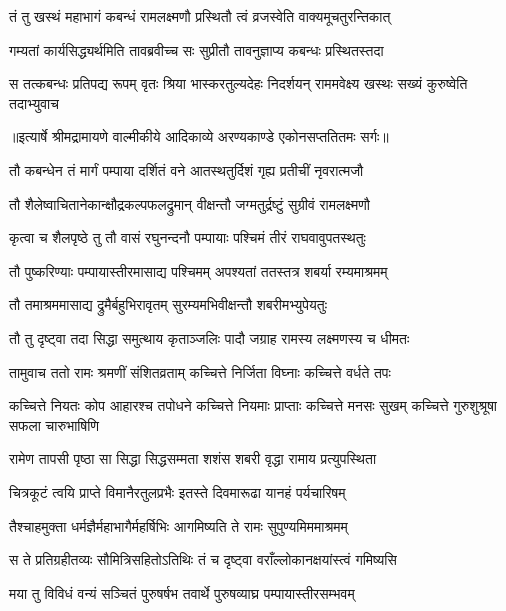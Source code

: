 \twolineshloka
{तं तु खस्थं महाभागं कबन्धं रामलक्ष्मणौ}
{प्रस्थितौ त्वं व्रजस्वेति वाक्यमूचतुरन्तिकात्} %

\twolineshloka
{गम्यतां कार्यसिद्ध्यर्थमिति तावब्रवीच्च सः}
{सुप्रीतौ तावनुज्ञाप्य कबन्धः प्रस्थितस्तदा} %

\fourlineindentedshloka
{स तत्कबन्धः प्रतिपद्य रूपम्}
{वृतः श्रिया भास्करतुल्यदेहः}
{निदर्शयन् राममवेक्ष्य खस्थः}
{सख्यं कुरुष्वेति तदाभ्युवाच} %


{॥इत्यार्षे श्रीमद्रामायणे वाल्मीकीये आदिकाव्ये अरण्यकाण्डे एकोनसप्ततितमः सर्गः॥}


\twolineshloka
{तौ कबन्धेन तं मार्गं पम्पाया दर्शितं वने}
{आतस्थतुर्दिशं गृह्य प्रतीचीं नृवरात्मजौ} %

\twolineshloka
{तौ शैलेष्वाचितानेकान्क्षौद्रकल्पफलद्रुमान्}
{वीक्षन्तौ जग्मतुर्द्रष्टुं सुग्रीवं रामलक्ष्मणौ} %

\twolineshloka
{कृत्वा च शैलपृष्ठे तु तौ वासं रघुनन्दनौ}
{पम्पायाः पश्चिमं तीरं राघवावुपतस्थतुः} %

\twolineshloka
{तौ पुष्करिण्याः पम्पायास्तीरमासाद्य पश्चिमम्}
{अपश्यतां ततस्तत्र शबर्या रम्यमाश्रमम्} %

\twolineshloka
{तौ तमाश्रममासाद्य द्रुमैर्बहुभिरावृतम्}
{सुरम्यमभिवीक्षन्तौ शबरीमभ्युपेयतुः} %

\twolineshloka
{तौ तु दृष्ट्वा तदा सिद्धा समुत्थाय कृताञ्जलिः}
{पादौ जग्राह रामस्य लक्ष्मणस्य च धीमतः} %

\twolineshloka
{तामुवाच ततो रामः श्रमणीं संशितव्रताम्}
{कच्चित्ते निर्जिता विघ्नाः कच्चित्ते वर्धते तपः} %

\threelineshloka
{कच्चित्ते नियतः कोप आहारश्च तपोधने}
{कच्चित्ते नियमाः प्राप्ताः कच्चित्ते मनसः सुखम्}
{कच्चित्ते गुरुशुश्रूषा सफला चारुभाषिणि} %

\twolineshloka
{रामेण तापसी पृष्ठा सा सिद्धा सिद्धसम्मता}
{शशंस शबरी वृद्धा रामाय प्रत्युपस्थिता} %

\twolineshloka
{चित्रकूटं त्वयि प्राप्ते विमानैरतुलप्रभैः}
{इतस्ते दिवमारूढा यानहं पर्यचारिषम्} %

\twolineshloka
{तैश्चाहमुक्ता धर्मज्ञैर्महाभागैर्महर्षिभिः}
{आगमिष्यति ते रामः सुपुण्यमिममाश्रमम्} %

\twolineshloka
{स ते प्रतिग्रहीतव्यः सौमित्रिसहितोऽतिथिः}
{तं च दृष्ट्वा वराँल्लोकानक्षयांस्त्वं गमिष्यसि} %

\twolineshloka
{मया तु विविधं वन्यं सञ्चितं पुरुषर्षभ}
{तवार्थे पुरुषव्याघ्र पम्पायास्तीरसम्भवम्} %

